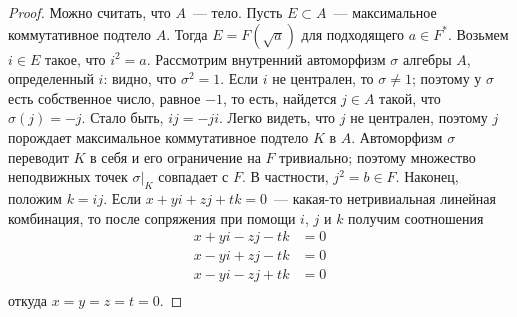 \documentclass[a4paper,oneside,12pt]{article}
\theoremstyle{plain} { \swapnumbers
\newtheorem{theorem}{Теорема}[subsection]
\newtheorem{corollary}[theorem]{Следствие}
\newtheorem{lemma}[theorem]{Лемма}
\newtheorem{proposition}[theorem]{Утверждение}
\newtheorem{claim}[theorem]{Факт}
}
\theoremstyle{definition} { \swapnumbers
\newtheorem{definition}[theorem]{Определение}
\newtheorem{notation}[theorem]{Обозначение}
\newtheorem{remark}[theorem]{Замечание}
\newtheorem{remarks}[theorem]{Замечания}
\newtheorem{example}[theorem]{Пример}
\newtheorem{examples}[theorem]{Примеры}
\newtheorem{sssection}[theorem]{}
}
\begin{document}
\begin{proof}
Можно считать, что $A$~--- тело. Пусть $E\subset A$~--- максимальное коммутативное подтело $A$.
Тогда $E=F(\sqrt{a})$ для подходящего $a\in F^*$. Возьмем $i\in E$ такое, что $i^2=a$. Рассмотрим
внутренний автоморфизм $\sigma$ алгебры $A$, определенный $i$: видно, что $\sigma^2=1$. Если
$i$ не централен, то $\sigma\neq 1$; поэтому у $\sigma$ есть собственное число, равное $-1$,
то есть, найдется $j\in A$ такой, что $\sigma(j)=-j$. Стало быть, $ij=-ji$. Легко видеть, что
$j$ не централен, поэтому $j$ порождает максимальное коммутативное подтело $K$ в $A$.
Автоморфизм $\sigma$ переводит $K$ в себя и его ограничение на $F$ тривиально; поэтому
множество неподвижных точек $\sigma|_K$ совпадает с $F$. В частности, $j^2=b\in F$.
Наконец, положим $k=ij$. Если $x+yi+zj+tk=0$~--- какая-то нетривиальная линейная комбинация,
то после сопряжения при помощи $i$, $j$ и $k$ получим соотношения
$$
\begin{aligned}
x+yi-zj-tk&=0\\
x-yi+zj-tk&=0\\
x-yi-zj+tk&=0\\
\end{aligned}
$$
откуда $x=y=z=t=0$.
\end{proof}
\end{document}
